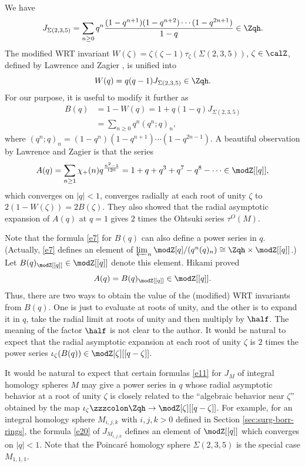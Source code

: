 \documentclass{amsart}
\numberwithin{equation}{section}
\numberwithin{figure}{section}
\theoremstyle{plain}
\theoremstyle{definition}
\theoremstyle{remark}
\begin{document}
We have
\begin{equation}
  \label{e11}
  J_{\Sigma (2,3,5)}
  =\sum_{n\ge 0}q^n\frac{(1-q^{n+1})(1-q^{n+2})\cdots(1-q^{2n+1})}{1-q}\in \Zqh.
\end{equation}
The modified WRT invariant $W(\zeta )=\zeta (\zeta -1)\tau _\zeta (\Sigma (2,3,5))$,
$\zeta \in \calZ$, defined by Lawrence and Zagier \cite{Lawrence-Zagier}, is
unified into
\begin{equation*}
  W(q)=q(q-1)J_{\Sigma (2,3,5)}\in \Zqh.
\end{equation*}
For our purpose, it is useful to modify it further as
\begin{equation}
  \label{e7}
  \begin{split}
    B(q)&=1-W(q) = 1+q(1-q)J_{\Sigma (2,3,5)}\\
    &=\sum_{n\ge 0}q^n(q^n;q)_n,
  \end{split}
\end{equation}
where $(q^n;q)_n=(1-q^n)(1-q^{n+1})\cdots (1-q^{2n-1})$.  A beautiful
observation by Lawrence and Zagier \cite{Lawrence-Zagier} is that the
series
\begin{equation*}
  A(q)=\sum_{n\ge 1}\chi _+(n)q^{\frac{n^2-1}{120}}=1+q+q^3+q^7-q^8-\dots \in \modZ [[q]],
\end{equation*}
which converges on $|q|<1$, converges radially at each root of
unity $\zeta $ to $2(1-W(\zeta ))=2B(\zeta )$.  They also showed that the radial
asymptotic expansion of $A(q)$ at $q=1$ gives $2$ times the Ohtsuki
series $\tau ^O(M)$.

Note that the formula \eqref{e7} for $B(q)$ can also define a power
series in $q$.  (Actually, \eqref{e7} defines an element of
$\varprojlim_{n}\modZ [q]/(q^n(q)_n)\cong\Zqh\times \modZ [[q]]$.)  Let
$B(q)_{\modZ [[q]]}\in \modZ [[q]]$ denote this element.  Hikami \cite{Hikami4} proved
\begin{equation*}
  A(q)=B(q)_{\modZ [[q]]}\in \modZ [[q]].
\end{equation*}
Thus, there are two ways to obtain the value of the (modified) WRT
invariants from $B(q)$.  One is just to evaluate at roots of unity,
and the other is to expand it in $q$, take the radial limit at roots
of unity and then multiply by $\half$.  The meaning of the factor
$\half$ is not clear to the author.  It would be natural to expect
that the radial asymptotic expansion at each root of unity $\zeta $ is $2$
times the power series $\iota _\zeta (B(q))\in \modZ [\zeta ][[q-\zeta ]]$.

It would be natural to expect that certain formulas \eqref{e11} for
$J_M$ of integral homology spheres $M$ may give a power series in $q$
whose radial asymptotic behavior at a root of unity $\zeta $ is closely
related to the ``algebraic behavior near $\zeta $'' obtained by the map
$\iota _\zeta \zzzcolon \Zqh\rightarrow \modZ [\zeta ][[q-\zeta ]]$.  For example, for an integral homology
sphere $M_{i,j,k}$ with $i,j,k>0$ defined in Section
\ref{sec:surg-borr-rings}, the formula \ref{e20} of $J_{M_{i,j,k}}$
defines an element of $\modZ [[q]]$ which converges on $|q|<1$.  Note
that the Poincar\'e homology sphere $\Sigma (2,3,5)$ is the special case
$M_{1,1,1}$.
\end{document}
